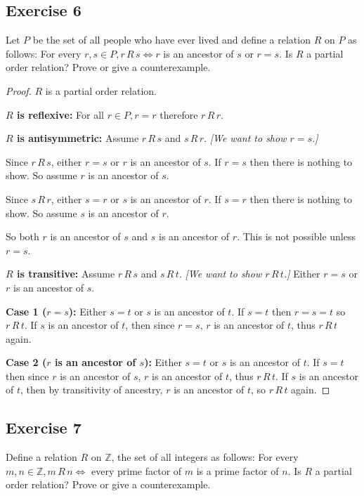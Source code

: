 \documentclass[14pt]{extarticle}
\newcommand{\Z}{\mathbb{Z}}
\begin{document}
\subsection{Exercise 6}
Let $P$ be the set of all people who have ever lived and define a relation $R$ on $P$ as follows: For every \(r, s 
\in P, r \,R\, s \iff r\) is an ancestor of \(s\) or \(r = s\). Is $R$ a partial order relation? Prove or give a 
counterexample.

\begin{proof}
$R$ is a partial order relation.

{\bf $R$ is reflexive:} For all \(r \in P, r = r\) therefore \(r \,R\, r\).

{\bf $R$ is antisymmetric:} Assume \(r \,R\, s\) and \(s \,R\, r\). {\it [We want to show \(r = s\).]} 

Since \(r \,R\, s\), either \(r=s\) or $r$ is an ancestor of $s$. If \(r=s\) then there is nothing to show. So assume
$r$ is an ancestor of $s$.

Since \(s \,R\, r\), either \(s=r\) or $s$ is an ancestor of $r$. If $s=r$ then there is nothing to show. So assume
$s$ is an ancestor of $r$.

So both $r$ is an ancestor of $s$ and $s$ is an ancestor of $r$. This is not possible unless \(r=s\).

{\bf $R$ is transitive:} Assume \(r \,R\, s\) and \(s \,R\, t\). {\it [We want to show \(r \,R\, t\).]} Either $r=s$ or
$r$ is an ancestor of $s$.

{\bf Case 1 (\(r=s\)):} Either $s=t$ or $s$ is an ancestor of $t$. If $s=t$ then $r=s=t$ so \(r \,R\, t\). If $s$ is 
an ancestor of $t$, then since $r=s$, $r$ is an ancestor of $t$, thus \(r \,R\, t\) again.

{\bf Case 2 ($r$ is an ancestor of $s$):} Either $s=t$ or $s$ is an ancestor of $t$. If $s=t$ then since $r$ is an 
ancestor of $s$, $r$ is an ancestor of $t$, thus \(r \,R\, t\). If $s$ is an ancestor of $t$, then by transitivity of 
ancestry, $r$ is an ancestor of $t$, so \(r \,R\, t\) again.
\end{proof}

\subsection{Exercise 7}
Define a relation $R$ on $\Z$, the set of all integers as follows: For every \(m, n \in \Z, m \,R\, n \iff\) every 
prime factor of $m$ is a prime factor of $n$. Is $R$ a partial order relation? Prove or give a counterexample.
\end{document}
